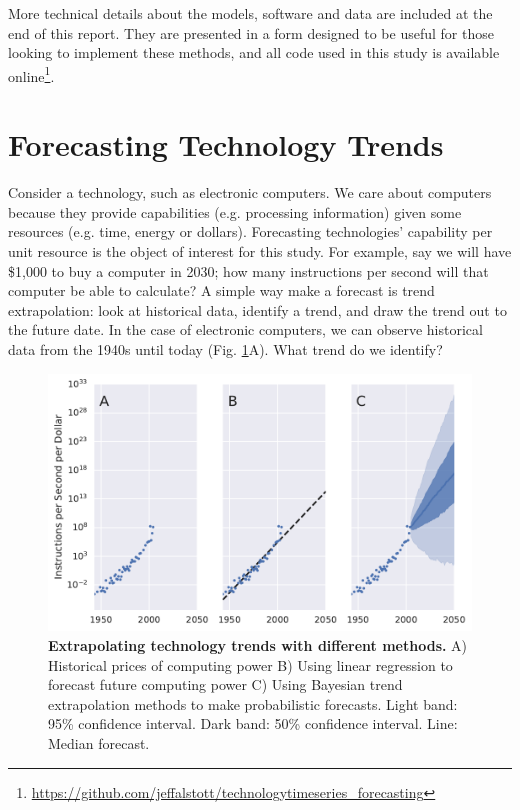 \documentclass{article}
\begin{document}
More technical details about the models, software and data are included at the end of this report. They are presented in a form designed to be useful for those looking to implement these methods, and all code used in this study is available online\footnote{\url{https://github.com/jeffalstott/technologytimeseries_forecasting}}.

\section{Forecasting Technology Trends}
Consider a technology, such as electronic computers. We care about computers because they provide capabilities (e.g. processing information) given some resources (e.g. time, energy or dollars).  Forecasting technologies' capability per unit resource is the object of interest for this study. For example, say we will have \$1,000 to buy a computer in 2030; how many instructions per second will that computer be able to calculate? A simple way make a forecast is trend extrapolation: look at historical data, identify a trend, and draw the trend out to the future date. In the case of electronic computers, we can observe historical data from the 1940s until today (Fig. \ref{fig:trend_extrapolation_example}A). What trend do we identify?

\begin{figure}
    \centering
    \includegraphics[width=.75\textwidth]{figs/trend_extrapolation_example.pdf}
    \caption{\textbf{Extrapolating technology trends with different methods.} A) Historical prices of computing power B) Using linear regression to forecast future computing power C) Using Bayesian trend extrapolation methods to make probabilistic forecasts. Light band: 95\% confidence interval. Dark band: 50\% confidence interval. Line: Median forecast.}
    \label{fig:trend_extrapolation_example}
\end{figure}
\end{document}
